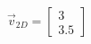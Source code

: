 \documentclass[preview]{standalone}
\begin{document}
\begin{align*}
\vec{v}_{2D} = \begin{bmatrix} 3 \\ 3.5 \end{bmatrix}
\end{align*}
\end{document}

